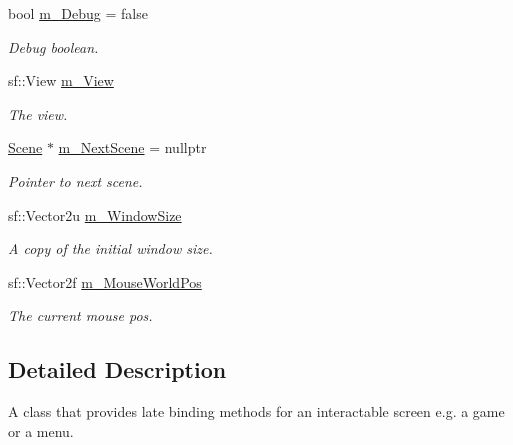 \begin{DoxyCompactItemize}
\item 
\mbox{\label{class_scene_a7c893a2bcd5b45f758d1ca2596f2c080}} 
bool \hyperlink{class_scene_a7c893a2bcd5b45f758d1ca2596f2c080}{m\+\_\+\+Debug} = false
\begin{DoxyCompactList}\small\item\em Debug boolean. \end{DoxyCompactList}\item 
\mbox{\label{class_scene_ac481124f477d63e6c71993685b4bd675}} 
sf\+::\+View \hyperlink{class_scene_ac481124f477d63e6c71993685b4bd675}{m\+\_\+\+View}
\begin{DoxyCompactList}\small\item\em The view. \end{DoxyCompactList}\item 
\mbox{\label{class_scene_a7f2cc1644a291a7102b8e1d069541d65}} 
\hyperlink{class_scene}{Scene} $\ast$ \hyperlink{class_scene_a7f2cc1644a291a7102b8e1d069541d65}{m\+\_\+\+Next\+Scene} = nullptr
\begin{DoxyCompactList}\small\item\em Pointer to next scene. \end{DoxyCompactList}\item 
\mbox{\label{class_scene_a2f342aba86b1baa65a92a201ebf89502}} 
sf\+::\+Vector2u \hyperlink{class_scene_a2f342aba86b1baa65a92a201ebf89502}{m\+\_\+\+Window\+Size}
\begin{DoxyCompactList}\small\item\em A copy of the initial window size. \end{DoxyCompactList}\item 
\mbox{\label{class_scene_a4714ea68285b5fb621f9355ac09f3a63}} 
sf\+::\+Vector2f \hyperlink{class_scene_a4714ea68285b5fb621f9355ac09f3a63}{m\+\_\+\+Mouse\+World\+Pos}
\begin{DoxyCompactList}\small\item\em The current mouse pos. \end{DoxyCompactList}\end{DoxyCompactItemize}


\subsection{Detailed Description}
A class that provides late binding methods for an interactable screen e.\+g. a game or a menu. 

